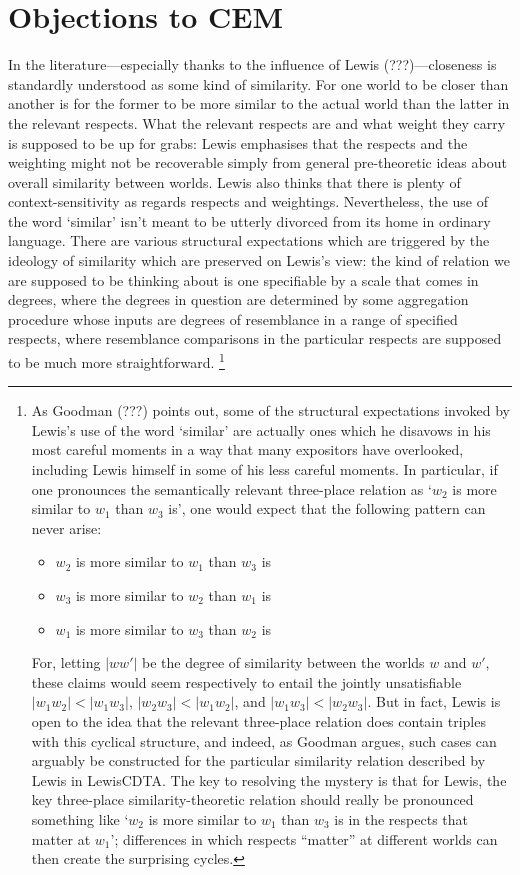 \documentclass[leqno, 11pt, a5paper, openany]{article}
\begin{document}
\section{Objections to CEM} \label{objections-to-cem} In the literature---especially thanks to the influence of Lewis (???)---closeness is standardly understood as some kind of similarity. For one world to be closer than another is for the former to be more similar to the actual world than the latter in the relevant respects. What the relevant respects are and what weight they carry is supposed to be up for grabs: Lewis emphasises that the respects and the weighting might not be recoverable simply from general pre-theoretic ideas about overall similarity between worlds. Lewis also thinks that there is plenty of context-sensitivity as regards respects and weightings. Nevertheless, the use of the word ‘similar’ isn't meant to be utterly divorced from its home in ordinary language. There are various structural expectations which are triggered by the ideology of similarity which are preserved on Lewis's view: the kind of relation we are supposed to be thinking about is one specifiable by a scale that comes in degrees, where the degrees in question are determined by some aggregation procedure whose inputs are degrees of resemblance in a range of specified respects, where resemblance comparisons in the particular respects are supposed to be much more straightforward.%
\footnote{As Goodman (???) points out, some of the structural expectations invoked by Lewis's use of the word ‘similar’ are actually ones which he disavows in his most careful moments in a way that many expositors have overlooked, including Lewis himself in some of his less careful moments. In particular, if one pronounces the semantically relevant three-place relation as ‘$w_2$ is more similar to $w_1$ than $w_3$ is’, one would expect that the following pattern can never arise:
	\begin{itemize}
		\item
		$w_2$ is more similar to $w_1$ than
		$w_3$ is
		\item
		$w_3$ is more similar to $w_2$ than
		$w_1$ is
		\item
		$w_1$ is more similar to $w_3$ than
		$w_2$ is
	\end{itemize}
	For, letting $|ww'|$ be the degree of similarity between the worlds $w$ and $w'$, these claims would seem respectively to entail the jointly unsatisfiable $|w_1w_2|<|w_1w_3|$, $|w_2w_3|<|w_1w_2|$, and $|w_1w_3|<|w_2w_3|$. But in fact, Lewis is open to the idea that the relevant three-place relation does contain triples with this cyclical structure, and indeed, as Goodman argues, such cases can arguably be constructed for the particular similarity relation described by Lewis in LewisCDTA. The key to resolving the mystery is that for Lewis, the key three-place similarity-theoretic relation should really be pronounced something like ‘$w_2$ is more similar to $w_1$ than $w_3$ is in the respects that matter at $w_1$’; differences in which respects “matter” at different worlds can then create the surprising cycles.}
\end{document}
